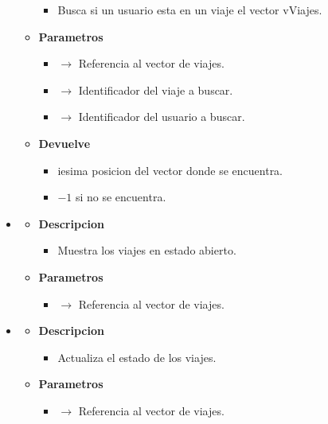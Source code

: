 \begin{itemize}
\begin{itemize}
\begin{itemize}
			\item  Busca si un usuario esta en un viaje el vector vViajes.
		\end{itemize}
		\item \textbf{Parametros}
		\begin{itemize}
			\item {} $\rightarrow$ Referencia al vector de viajes.
            \item {} $\rightarrow$ Identificador del viaje a buscar.
            \item {} $\rightarrow$ Identificador del usuario a buscar.
		\end{itemize}
        \item \textbf{Devuelve}
		\begin{itemize}
			\item iesima posicion del vector donde se encuentra.
            \item $-1$ si no se encuentra.
		\end{itemize}
	\end{itemize}
    \item{}
    \begin{itemize}
        \item \textbf{Descripcion}
        \begin{itemize}
			\item  Muestra los viajes en estado abierto.
		\end{itemize}
		\item \textbf{Parametros}
		\begin{itemize}
			\item {}  $\rightarrow$ Referencia al vector de viajes.
		\end{itemize}
	\end{itemize}
    \item {}
    \begin{itemize}
        \item \textbf{Descripcion}
        \begin{itemize}
			\item  Actualiza el estado de los viajes.
		\end{itemize}
		\item \textbf{Parametros}
		\begin{itemize}
			\item {}  $\rightarrow$ Referencia al vector de viajes.
		\end{itemize}
	\end{itemize}
\end{itemize}
\newpage
